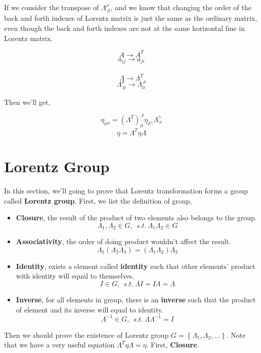 \documentclass[12pt]{article}
\begin{document}
If we consider the transpose of $\Lambda^{\rho}_{\ \mu}$, and we know that changing the order of the back and forth indexes of Lorentz matrix is just the same as the ordinary matrix, even though the back and forth indexes are not at the same horizontal line in Lorentz matrix.

\begin{center}
    \[ A \rightarrow A^T \]
    \[ a_{ij} \rightarrow a_{ji} \]
    \\
    \[ \Lambda \rightarrow \Lambda^T \]
    \[ \Lambda^{\rho}_{\ \mu} \rightarrow \Lambda^{\ \rho}_{\mu} \]
\end{center}

Then we'll get,

\begin{center}
    \[ \eta_{\mu \nu} = \left( \Lambda^T \right)^{\ \rho}_{\mu} \eta_{\rho \gamma} \Lambda^{\gamma}_{\ \nu} \]
    \[ \eta = \Lambda^T \eta \Lambda \]
\end{center}

\section{Lorentz Group}

In this section, we'll going to prove that Lorentz transformation forms a group called \textbf{Lorentz group}. First, we list the definition of group,

\begin{itemize}
    \item \textbf{Closure}, the result of the product of two elements also belongs to the group. \[\Lambda_{1}, \Lambda_{2} \in G,\ \ s.t.\ \Lambda_{1}\Lambda_{2} \in G \]
    \item \textbf{Associativity}, the order of doing product wouldn't affect the result. \[\Lambda_{1} \left(\Lambda_{2}\Lambda_{3}\right) = \left(\Lambda_{1}\Lambda_{2}\right)\Lambda_{3} \]
    \item \textbf{Identity}, exists a element called \textbf{identity} such that other elements' product with identity will equal to themselves. \[ I \in G,\ \ s.t.\ \Lambda I = I \Lambda = \Lambda \]
    \item \textbf{Inverse}, for all elements in group, there is an \textbf{inverse} such that the product of element and its inverse will equal to identity. \[ \Lambda^{-1} \in G,\ \ s.t.\ \Lambda \Lambda^{-1} = I \]
\end{itemize}

Then we should prove the existence of Lorentz group $G = \left\{ \Lambda_1, \Lambda_2, ...\right\}$. Note that we have a very useful equation $\Lambda^T \eta \Lambda = \eta$. First, \textbf{Closure}.
\end{document}
